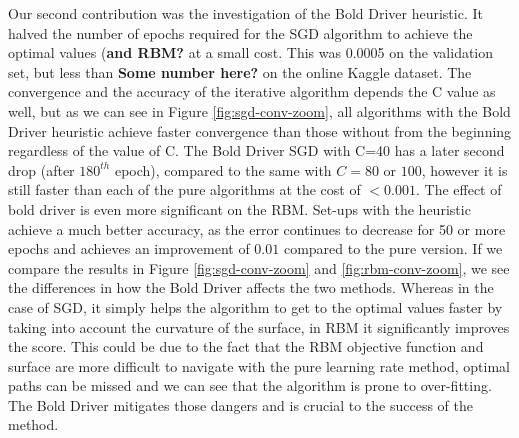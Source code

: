 \documentclass[10pt,conference,compsocconf]{IEEEtran}
\begin{document}
	Our second contribution was the investigation of the Bold Driver heuristic. It halved the number of epochs required for the SGD algorithm to achieve the optimal values (\textbf{and RBM?} at a small cost. This was 0.0005 on the validation set, but less than \textbf{Some number here?} on the online Kaggle dataset. The convergence and the accuracy of the iterative algorithm depends the C value as well, but as we can see in Figure \ref{fig:sgd-conv-zoom}, all algorithms with the Bold Driver heuristic achieve faster convergence than those without from the beginning regardless of the value of C. The Bold Driver SGD with C=40 has a later second drop (after $180^{th}$ epoch), compared to the same with $C=80$ or $100$, however it is still faster than each of the pure algorithms at the cost of $<0.001$. The effect of bold driver is even more significant on the RBM. Set-ups with the heuristic achieve a much better accuracy, as the error continues to decrease for 50 or more epochs and achieves an improvement of $0.01$ compared to the pure version. If we compare the results in Figure \ref{fig:sgd-conv-zoom} and \ref{fig:rbm-conv-zoom}, we see the differences in how the Bold Driver affects the two methods. Whereas in the case of SGD, it simply helps the algorithm to get to the optimal values faster by taking into account the curvature of the surface, in RBM it significantly improves the score. This could be due to the fact that the RBM objective function and surface are more difficult to navigate with the pure learning rate method, optimal paths can be missed and we can see that the algorithm is prone to over-fitting. The Bold Driver mitigates those dangers and is crucial to the success of the method. 
	
	
	
	
	
\end{document}
